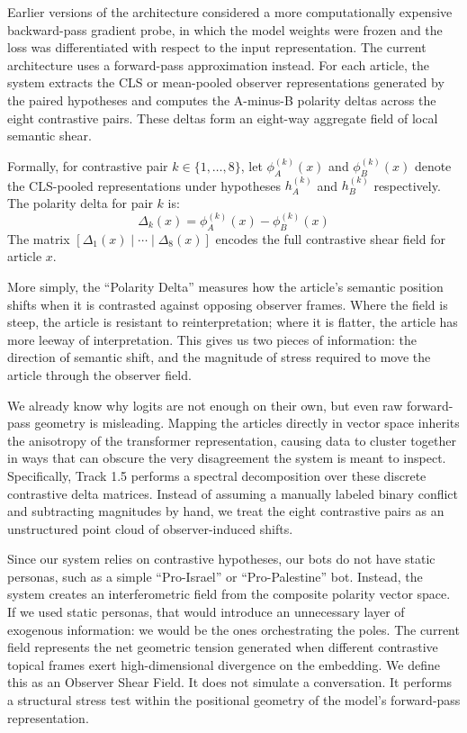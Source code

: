 Earlier versions of the architecture considered a more computationally expensive backward-pass gradient probe, in which the model weights were frozen and the loss was differentiated with respect to the input representation. The current architecture uses a forward-pass approximation instead. For each article, the system extracts the CLS or mean-pooled observer representations generated by the paired hypotheses and computes the A-minus-B polarity deltas across the eight contrastive pairs. These deltas form an eight-way aggregate field of local semantic shear.

Formally, for contrastive pair $k \in \{1,\ldots,8\}$, let $\phi_A^{(k)}(x)$ and $\phi_B^{(k)}(x)$ denote the CLS-pooled representations under hypotheses $h_A^{(k)}$ and $h_B^{(k)}$ respectively. The polarity delta for pair $k$ is:
\begin{equation}
    \Delta_k(x) = \phi_A^{(k)}(x) - \phi_B^{(k)}(x)
\end{equation}
The matrix $[\Delta_1(x) \mid \cdots \mid \Delta_8(x)]$ encodes the full contrastive shear field for article $x$.

More simply, the ``Polarity Delta'' measures how the article's semantic position shifts when it is contrasted against opposing observer frames. Where the field is steep, the article is resistant to reinterpretation; where it is flatter, the article has more leeway of interpretation. This gives us two pieces of information: the direction of semantic shift, and the magnitude of stress required to move the article through the observer field.

We already know why logits are not enough on their own, but even raw forward-pass geometry is misleading. Mapping the articles directly in vector space inherits the anisotropy of the transformer representation, causing data to cluster together in ways that can obscure the very disagreement the system is meant to inspect. Specifically, Track 1.5 performs a spectral decomposition over these discrete contrastive delta matrices. Instead of assuming a manually labeled binary conflict and subtracting magnitudes by hand, we treat the eight contrastive pairs as an unstructured point cloud of observer-induced shifts.

Since our system relies on contrastive hypotheses, our bots do not have static personas, such as a simple ``Pro-Israel'' or ``Pro-Palestine'' bot. Instead, the system creates an interferometric field from the composite polarity vector space. If we used static personas, that would introduce an unnecessary layer of exogenous information: we would be the ones orchestrating the poles. The current field represents the net geometric tension generated when different contrastive topical frames exert high-dimensional divergence on the embedding. We define this as an Observer Shear Field. It does not simulate a conversation. It performs a structural stress test within the positional geometry of the model's forward-pass representation.

